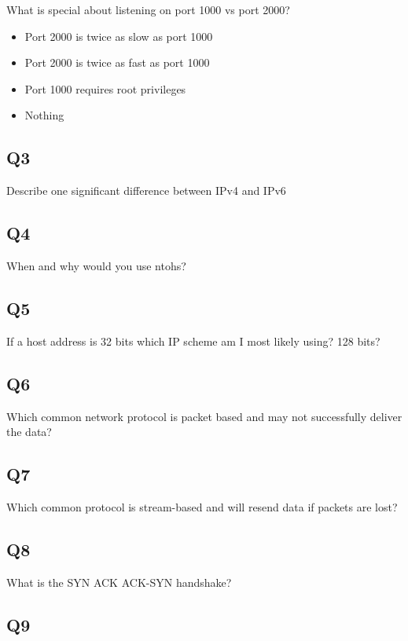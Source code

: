 What is special about listening on port 1000 vs port 2000?

\begin{itemize}
\tightlist
\item
  Port 2000 is twice as slow as port 1000
\item
  Port 2000 is twice as fast as port 1000
\item
  Port 1000 requires root privileges
\item
  Nothing
\end{itemize}

\subsection{Q3}\label{q3-4}

Describe one significant difference between IPv4 and IPv6

\subsection{Q4}\label{q4-4}

When and why would you use ntohs?

\subsection{Q5}\label{q5-3}

If a host address is 32 bits which IP scheme am I most likely using? 128 bits?

\subsection{Q6}\label{q6-1}

Which common network protocol is packet based and may not successfully deliver the data?

\subsection{Q7}\label{q7-1}

Which common protocol is stream-based and will resend data if packets are lost?

\subsection{Q8}\label{q8}

What is the SYN ACK ACK-SYN handshake?

\subsection{Q9}\label{q9}

